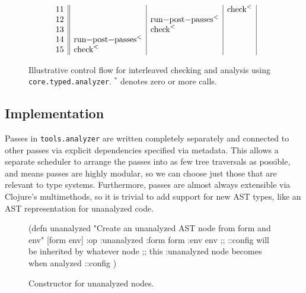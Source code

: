 \begin{figure*}
$$\begin{array}{r||l|l|l|}
     11         &                                    &                                 & \text{\clj{check}}^{<}          \\
     12         &                                    & \text{\clj{run-post-passes}}^{<}&                                 \\
     13         &                                    & \text{\clj{check}}^{<}          &                                 \\
     14         & \text{\clj{run-post-passes}}^{<}   &                                 &                                 \\
     15         & \text{\clj{check}}^{<}             &                                 &                                 \\
  \end{array}
$$

  \caption{Illustrative control flow for interleaved checking and analysis using
  \texttt{core.typed.analyzer}. ${}^*$ denotes zero or more calls.
  }
  \label{fig:analyzer:typed-analyzer-overview}
\end{figure*}

\subsection{Implementation}

Passes in \texttt{tools.analyzer} are written completely separately and connected to other passes
via explicit dependencies specified via metadata.
This allows a separate scheduler to arrange the passes into as few tree traversals as possible,
and means passes are highly modular, so we can choose just those that are relevant to type systems.
Furthermore, passes are almost always extensible via Clojure's multimethods, so it is trivial to add
support for new AST types, like an AST representation for unanalyzed code.


\begin{figure}
\begin{cljlisting}
(defn unanalyzed
  "Create an unanalyzed AST node from form and env"
  [form env]
  {:op :unanalyzed
   :form form
   :env env
   ;; ::config will be inherited by whatever node
   ;; this :unanalyzed node becomes when analyzed
   ::config {}})
\end{cljlisting}
  \caption{Constructor for unanalyzed nodes.}
  \label{fig:analyzer:unanalyzed-ctor}
\end{figure}

